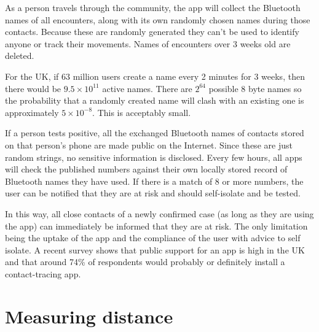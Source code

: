 \documentclass{article}
\begin{document}
As a person travels through the community, the app will collect the Bluetooth names of all encounters, along with its own randomly chosen names during those contacts. Because these are randomly generated they can't be used to identify anyone or track their movements. Names of encounters over 3 weeks old are deleted.

For the UK, if 63 million users create a name every 2 minutes for 3 weeks, then there would be $9.5\times10^{11}$ active names. There are $2^{64}$ possible 8 byte names so the probability that a randomly created name will clash with an existing one is approximately $5\times10^{-8}$. This is acceptably small.


If a person tests positive, all the exchanged Bluetooth names of contacts stored on that person's phone are made public on the Internet. Since these are just random strings, no sensitive information is disclosed. Every few hours, all apps will check the published numbers against their own locally stored record of Bluetooth names they have used. If there is a match of 8 or more numbers, the user can be notified that they are at risk and should self-isolate and be tested.

In this way, all close contacts of a newly confirmed case (as long as they are using the app) can immediately be informed that they are at risk. The only limitation being the uptake of the app and the compliance of the user with advice to self isolate. A recent survey\cite{abeler2020Support} shows that public support for an app is high in the UK and that around 74\% of respondents would probably or definitely install a contact-tracing app.

\section{Measuring distance}
\end{document}
